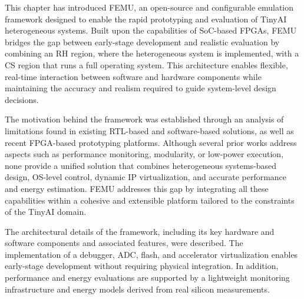         This chapter has introduced \mbox{FEMU}, an open-source and configurable emulation framework designed to enable the rapid prototyping and evaluation of TinyAI heterogeneous systems. Built upon the capabilities of SoC-based FPGAs, \mbox{FEMU} bridges the gap between early-stage development and realistic evaluation by combining an RH region, where the heterogeneous system is implemented, with a CS region that runs a full operating system. This architecture enables flexible, real-time interaction between software and hardware components while maintaining the accuracy and realism required to guide system-level design decisions.
        
        The motivation behind the framework was established through an analysis of limitations found in existing RTL-based and software-based solutions, as well as recent FPGA-based prototyping platforms. Although several prior works address aspects such as performance monitoring, modularity, or low-power execution, none provide a unified solution that combines heterogeneous systems-based design, OS-level control, dynamic IP virtualization, and accurate performance and energy estimation. \mbox{FEMU} addresses this gap by integrating all these capabilities within a cohesive and extensible platform tailored to the constraints of the TinyAI domain.

        \begin{table}[tp]
            \caption{Acquisition time comparison with and without flash virtualization.}
            \label{tbl:flash_virtualization}
            \centering
        \end{table}
        
        The architectural details of the framework, including its key hardware and software components and associated features, were described. The implementation of a debugger, ADC, flash, and accelerator virtualization enables early-stage development without requiring physical integration. In addition, performance and energy evaluations are supported by a lightweight monitoring infrastructure and energy models derived from real silicon measurements.
        
